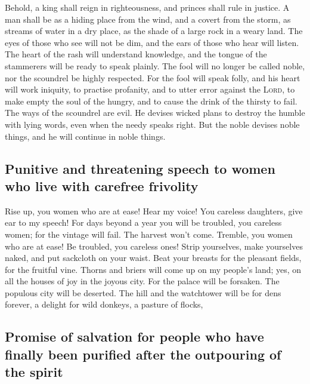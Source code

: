  Behold, a king shall reign in righteousness, and princes
shall rule in justice.  A man shall be as a hiding place
from the wind, and a covert from the storm, as streams of water in a dry
place, as the shade of a large rock in a weary land.  The
eyes of those who see will not be dim, and the ears of those who hear
will listen.  The heart of the rash will understand
knowledge, and the tongue of the stammerers will be ready to speak
plainly.  The fool will no longer be called noble, nor the
scoundrel be highly respected.  For the fool will speak
folly, and his heart will work iniquity, to practise profanity, and to
utter error against the \textsc{Lord}, to make empty the soul of the
hungry, and to cause the drink of the thirsty to fail. 
The ways of the scoundrel are evil. He devises wicked plans to destroy
the humble with lying words, even when the needy speaks right.
 But the noble devises noble things, and he will continue
in noble things.

\hypertarget{punitive-and-threatening-speech-to-women-who-live-with-carefree-frivolity}{%
\subsection{Punitive and threatening speech to women who live with
carefree
frivolity}\label{punitive-and-threatening-speech-to-women-who-live-with-carefree-frivolity}}

 Rise up, you women who are at ease! Hear my voice! You
careless daughters, give ear to my speech!  For days
beyond a year you will be troubled, you careless women; for the vintage
will fail. The harvest won't come.  Tremble, you women
who are at ease! Be troubled, you careless ones! Strip yourselves, make
yourselves naked, and put sackcloth on your waist.  Beat
your breasts for the pleasant fields, for the fruitful vine.
 Thorns and briers will come up on my people's land; yes,
on all the houses of joy in the joyous city.  For the
palace will be forsaken. The populous city will be deserted. The hill
and the watchtower will be for dens forever, a delight for wild donkeys,
a pasture of flocks,

\hypertarget{promise-of-salvation-for-people-who-have-finally-been-purified-after-the-outpouring-of-the-spirit}{%
\subsection{Promise of salvation for people who have finally been
purified after the outpouring of the
spirit}\label{promise-of-salvation-for-people-who-have-finally-been-purified-after-the-outpouring-of-the-spirit}}

